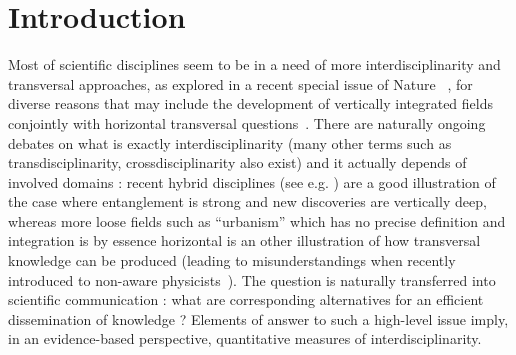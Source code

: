 
\author{Juste Raimbault$^{1,2}$}



\date{Received: date / Accepted: date}



\maketitle

\begin{abstract}
\end{abstract}

\section*{Introduction}
\label{sec:intro}

Most of scientific disciplines seem to be in a need of more interdisciplinarity and transversal approaches, as explored in a recent special issue of Nature~\cite{} %
, for diverse reasons that may include the development of vertically integrated fields conjointly with horizontal transversal questions~\cite{2009arXiv0907.2221B}. There are naturally ongoing debates on what is exactly interdisciplinarity (many other terms such as transdisciplinarity, crossdisciplinarity also exist) and it actually depends of involved domains : recent hybrid disciplines (see e.g. )%
are a good illustration of the case where entanglement is strong and new discoveries are vertically deep, whereas %
more loose fields such as ``urbanism'' which has no precise definition and integration is by essence horizontal is an other illustration of how transversal knowledge can be produced (leading to misunderstandings when recently introduced to non-aware physicists~\cite{dupuy2015sciences}).
The question is naturally transferred into scientific communication : what are corresponding alternatives for an efficient dissemination of knowledge ? Elements of answer to such a high-level issue imply, in an evidence-based perspective, quantitative measures of interdisciplinarity.

